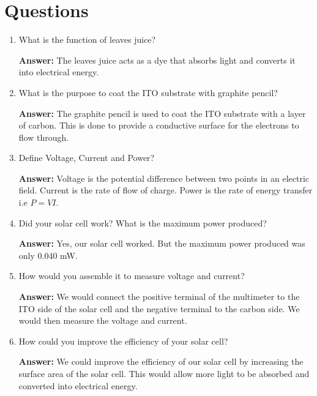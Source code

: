 \documentclass[a4paper, 12pt, english]{article}
\begin{document}
\section{Questions}
\begin{enumerate}
	\item What is the function of leaves juice?

	      \textbf{Answer:} The leaves juice acts as a dye that absorbs light and
	      converts it into electrical energy.

	\item What is the purpose to coat the ITO substrate with graphite pencil?

	      \textbf{Answer:} The graphite pencil is used to coat the ITO substrate with
	      a layer of carbon. This is done to provide a conductive surface for the
	      electrons to flow through.

	\item Define Voltage, Current and Power?

	      \textbf{Answer:} Voltage is the potential difference between two points in
	      an electric field. Current is the rate of flow of charge. Power is the rate
	      of energy transfer i.e $P = VI$.

	\item Did your solar cell work? What is the maximum power produced?

	      \textbf{Answer:} Yes, our solar cell worked. But the maximum power produced was
	      only 0.040 mW.

	\item How would you assemble it to measure voltage and current?

	      \textbf{Answer:} We would connect the positive terminal of the multimeter
	      to the ITO side of the solar cell and the negative terminal to the carbon
	      side. We would then measure the voltage and current.

	\item How could you improve the efficiency of your solar cell?

	      \textbf{Answer:} We could improve the efficiency of our solar cell by
	      increasing the surface area of the solar cell. This would allow more light
	      to be absorbed and converted into electrical energy.
\end{enumerate}
\end{document}
